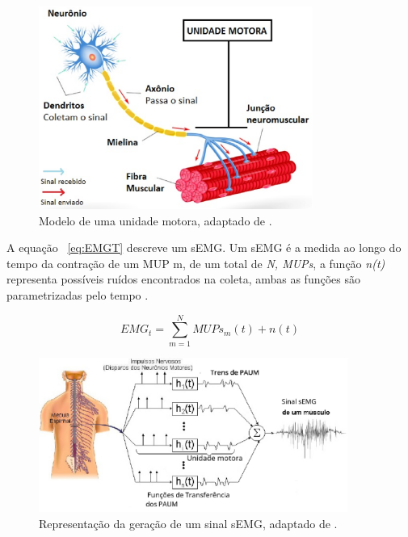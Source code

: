 \begin{figure}[!htb]
   \centering
    \includegraphics[width=0.8\textwidth]{figuras/motor-neuron.eps}
    \caption{Modelo de uma unidade motora, adaptado de .}
    \label{UnidadeMotora}
\end{figure}

A equação ~\ref{eq:EMGT} descreve um sEMG. Um sEMG é a medida ao longo do tempo da contração de um MUP m, de um total de \textit{N, MUPs}, a função \textit{n(t)} representa possíveis ruídos encontrados na coleta, ambas as funções são parametrizadas pelo tempo \cite{yousefi2014characterizing}.

\begin{equation} \label{eq:EMGT}
    EMG_{t} =\sum_{m=1}^{N} MUPs_{m}(t)+n(t)
\end{equation}

\begin{figure}[!htb]
    \centering
     \includegraphics[width=0.9\textwidth]{figuras/Representacao-esquematica-da-geracao-do-Sinal-Mioeletrico-de-um-musculo-a-partir-da.eps}
     \caption{Representação da geração de um sinal sEMG, adaptado de .}
     \label{PAUM}
 \end{figure}


